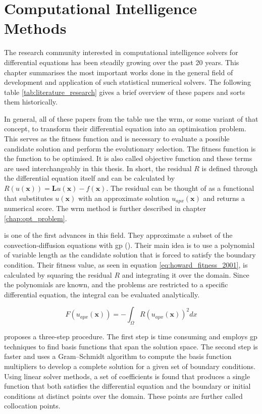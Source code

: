 \documentclass[./\jobname.tex]{subfiles}
\begin{document}
\section{Computational Intelligence Methods} 
\label{chap:literature_overview}

The research community interested in computational intelligence solvers for differential equations has been steadily growing over the past 20 years. This chapter summarises the most important works done in the general field of development and application of such statistical numerical solvers. The following table \ref{tab:literature_research} gives a brief overview of these papers and sorts them historically. 

In general, all of these papers from the table use the \gls{wrm}, or some variant of that concept, to transform their differential equation into an optimisation problem. This serves as the fitness function and is necessary to evaluate a possible candidate solution and perform the evolutionary selection. The fitness function is the function to be optimised. It is also called objective function and these terms are used interchangeably in this thesis. In short, the residual $R$ is defined through the differential equation itself and can be calculated by $R(u(\mathbf{x})) = \mathbf{L}u(\mathbf{x}) - f(\mathbf{x})$. The residual can be thought of as a functional that substitutes $u(\mathbf{x})$ with an approximate solution $u_{apx}(\mathbf{x})$ and returns a numerical score. The \gls{wrm} method is further described in chapter \ref{chap:opt_problem}.

\cite{howard_genetic_2001} is one of the first advances in this field. They approximate a subset of the convection-diffusion equations with \gls{gp} (\cite{koza_genetic_1992}). Their main idea is to use a polynomial of variable length as the candidate solution that is forced to satisfy the boundary condition. Their fitness value, as seen in equation \eqref{eq:howard_fitness_2001}, is calculated by squaring the residual $R$ and integrating it over the domain. Since the polynomials are known, and the problems are restricted to a specific differential equation, the integral can be evaluated analytically. 

\begin{equation}
\label{eq:howard_fitness_2001}
	F(u_{apx}(\mathbf{x})) = -\int_{\Omega} R(u_{apx}(\mathbf{x}))^2 dx
\end{equation}

\cite{kirstukas_hybrid_2005} proposes a three-step procedure. The first step is time consuming and employs \gls{gp} techniques to find basis functions that span the solution space. The second step is faster and uses a Gram–Schmidt algorithm to compute the basis function multipliers to develop a complete solution for a given set of boundary conditions. Using linear solver methods, a set of coefficients is found that produces a single function that both satisfies the differential equation and the boundary or initial conditions at distinct points over the domain. These points are further called collocation points. 
\end{document}
